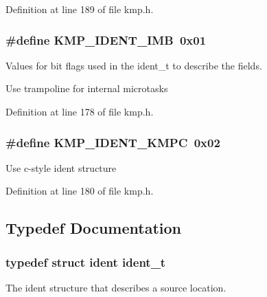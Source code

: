 Definition at line 189 of file kmp.\-h.

\hypertarget{group__BASIC__TYPES_ga951d8a0a41a4b285b3da9cabd7a99f85}{
\subsubsection[{K\-M\-P\-\_\-\-I\-D\-E\-N\-T\-\_\-\-I\-M\-B}]{\setlength{\rightskip}{0pt plus 5cm}\#define K\-M\-P\-\_\-\-I\-D\-E\-N\-T\-\_\-\-I\-M\-B~0x01}}\label{group__BASIC__TYPES_ga951d8a0a41a4b285b3da9cabd7a99f85}
Values for bit flags used in the ident\-\_\-t to describe the fields.

Use trampoline for internal microtasks 

Definition at line 178 of file kmp.\-h.

\hypertarget{group__BASIC__TYPES_ga50e3ecb5eb8d70f437a84a8b2bc9e88f}{
\subsubsection[{K\-M\-P\-\_\-\-I\-D\-E\-N\-T\-\_\-\-K\-M\-P\-C}]{\setlength{\rightskip}{0pt plus 5cm}\#define K\-M\-P\-\_\-\-I\-D\-E\-N\-T\-\_\-\-K\-M\-P\-C~0x02}}\label{group__BASIC__TYPES_ga50e3ecb5eb8d70f437a84a8b2bc9e88f}
Use c-\/style ident structure 

Definition at line 180 of file kmp.\-h.



\subsection{Typedef Documentation}
\hypertarget{group__BASIC__TYPES_ga690fda6b92f039a72db263c6b4394ddb}{
\subsubsection[{ident\-\_\-t}]{\setlength{\rightskip}{0pt plus 5cm}typedef struct {\bf ident}  {\bf ident\-\_\-t}}}\label{group__BASIC__TYPES_ga690fda6b92f039a72db263c6b4394ddb}
The ident structure that describes a source location. 